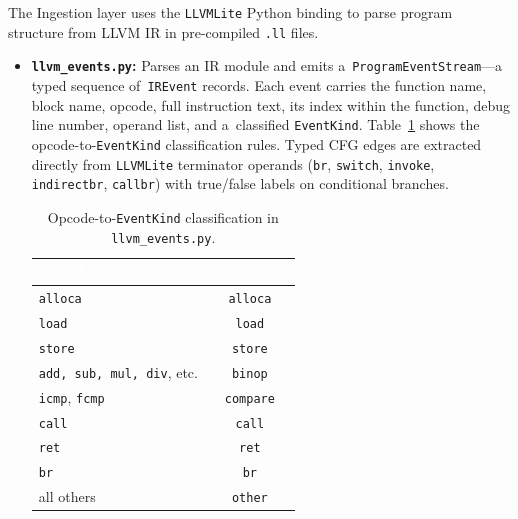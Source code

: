 The Ingestion layer uses the \texttt{LLVMLite} Python binding to parse program structure from LLVM IR in pre-compiled \texttt{.ll} files.

\begin{itemize}
    \item \textbf{\texttt{llvm\_events.py}:} Parses an IR module and emits a~\texttt{Program\-Event\-Stream}---a typed sequence of~\texttt{IR\-Event} records. Each event carries the function name, block name, opcode, full instruction text, its index within the function, debug line number, operand list, and a~classified \texttt{Event\-Kind}. Table~\ref{tab:eventkind_mapping} shows the opcode-to-\texttt{Event\-Kind} classification rules. Typed CFG edges are extracted directly from \texttt{LLVMLite} terminator operands (\texttt{br}, \texttt{switch}, \texttt{invoke}, \texttt{indirectbr}, \texttt{callbr}) with true/false labels on conditional branches.

\begin{table}[h]
\centering
\caption{Opcode-to-\texttt{EventKind} classification in \texttt{llvm\_events.py}.}
\label{tab:eventkind_mapping}
\renewcommand{\arraystretch}{1.3}
\begin{tabularx}{0.9\columnwidth}{|X|c|}
\hline
\rowcolor[HTML]{4472C4}
\hline
\textcolor{white}{\textbf{LLVM IR Opcode(s)}} & \textcolor{white}{\textbf{EventKind}} \\ \hline
\texttt{alloca}                              & \texttt{alloca}  \\ \hline
\texttt{load}                                & \texttt{load}    \\ \hline
\texttt{store}                               & \texttt{store}   \\ \hline
\texttt{add, sub, mul, div}, etc.            & \texttt{binop}   \\ \hline
\texttt{icmp}, \texttt{fcmp}                 & \texttt{compare} \\ \hline
\texttt{call}                                & \texttt{call}    \\ \hline
\texttt{ret}                                 & \texttt{ret}     \\ \hline
\texttt{br}                                  & \texttt{br}      \\ \hline
all others                                   & \texttt{other}   \\ \hline
\end{tabularx}
\end{table}


\end{itemize}
